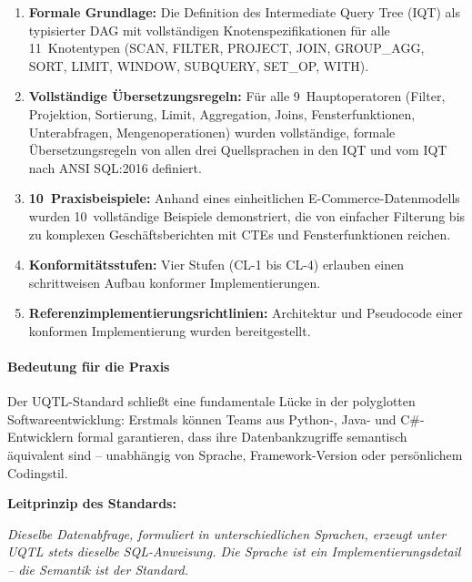 \begin{enumerate}[leftmargin=1.5cm]
  \item \textbf{Formale Grundlage:} Die Definition des Intermediate Query Tree
    (IQT) als typisierter DAG mit vollständigen Knotenspezifikationen für alle
    11~Knotentypen (SCAN, FILTER, PROJECT, JOIN, GROUP\_AGG, SORT, LIMIT,
    WINDOW, SUBQUERY, SET\_OP, WITH).

  \item \textbf{Vollständige Übersetzungsregeln:} Für alle 9~Hauptoperatoren
    (Filter, Projektion, Sortierung, Limit, Aggregation, Joins, Fensterfunktionen,
    Unterabfragen, Mengenoperationen) wurden vollständige, formale
    Übersetzungsregeln von allen drei Quellsprachen in den IQT und vom IQT
    nach ANSI SQL:2016 definiert.

  \item \textbf{10~Praxisbeispiele:} Anhand eines einheitlichen E-Commerce-Daten\-modells
    wurden 10~vollständige Beispiele demonstriert, die von einfacher Filterung bis
    zu komplexen Geschäftsberichten mit CTEs und Fensterfunktionen reichen.

  \item \textbf{Konformitätsstufen:} Vier Stufen (CL-1 bis CL-4) erlauben
    einen schrittweisen Aufbau konformer Implementierungen.

  \item \textbf{Referenzimplementierungsrichtlinien:} Architektur und
    Pseudocode einer konformen Implementierung wurden bereitgestellt.
\end{enumerate}

\paragraph{Bedeutung für die Praxis}

Der UQTL-Standard schließt eine fundamentale Lücke in der polyglotten
Softwareentwicklung: Erstmals können Teams aus Python-, Java- und
C\#-Entwicklern formal garantieren, dass ihre Datenbankzugriffe semantisch
äquivalent sind -- unabhängig von Sprache, Framework-Version oder persönlichem
Codingstil.

\begin{successbox}
\textbf{Leitprinzip des Standards:}

\emph{Dieselbe Datenabfrage, formuliert in unterschiedlichen Sprachen,
erzeugt unter UQTL stets dieselbe SQL-Anweisung. Die Sprache ist ein
Implementierungsdetail -- die Semantik ist der Standard.}
\end{successbox}

